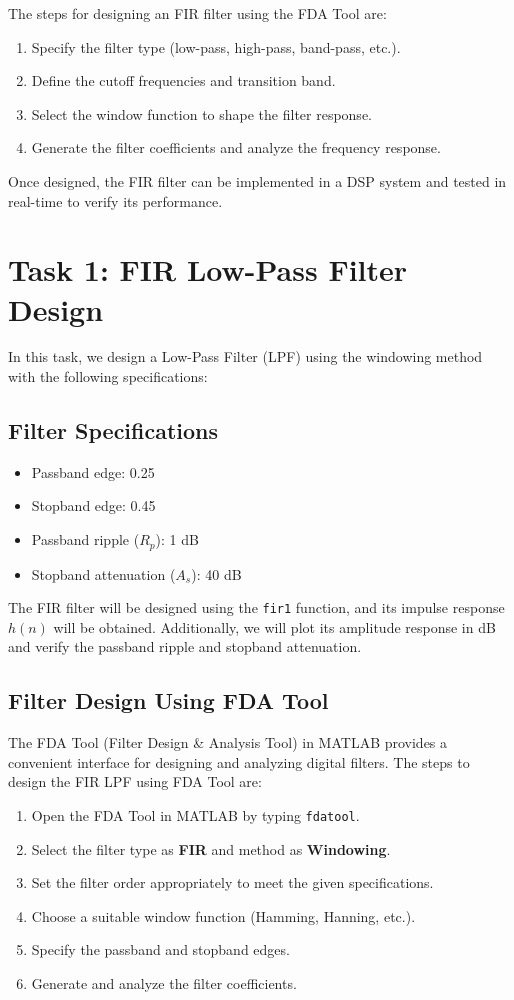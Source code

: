 \documentclass[a4paper,12pt]{article}
\begin{document}
The steps for designing an FIR filter using the FDA Tool are:
\begin{enumerate}
    \item Specify the filter type (low-pass, high-pass, band-pass, etc.).
    \item Define the cutoff frequencies and transition band.
    \item Select the window function to shape the filter response.
    \item Generate the filter coefficients and analyze the frequency response.
\end{enumerate}

Once designed, the FIR filter can be implemented in a DSP system and tested in real-time to verify its performance.

\section{Task 1: FIR Low-Pass Filter Design}

In this task, we design a Low-Pass Filter (LPF) using the windowing method with the following specifications:

\subsection{Filter Specifications}
\begin{itemize}
    \item Passband edge: 0.25
    \item Stopband edge: 0.45
    \item Passband ripple ($R_p$): 1 dB
    \item Stopband attenuation ($A_s$): 40 dB
\end{itemize}

The FIR filter will be designed using the \texttt{fir1} function, and its impulse response $h(n)$ will be obtained. Additionally, we will plot its amplitude response in dB and verify the passband ripple and stopband attenuation.

\subsection{Filter Design Using FDA Tool}
The FDA Tool (Filter Design & Analysis Tool) in MATLAB provides a convenient interface for designing and analyzing digital filters. The steps to design the FIR LPF using FDA Tool are:
\begin{enumerate}
    \item Open the FDA Tool in MATLAB by typing \texttt{fdatool}.
    \item Select the filter type as \textbf{FIR} and method as \textbf{Windowing}.
    \item Set the filter order appropriately to meet the given specifications.
    \item Choose a suitable window function (Hamming, Hanning, etc.).
    \item Specify the passband and stopband edges.
    \item Generate and analyze the filter coefficients.
\end{enumerate}
\end{document}
